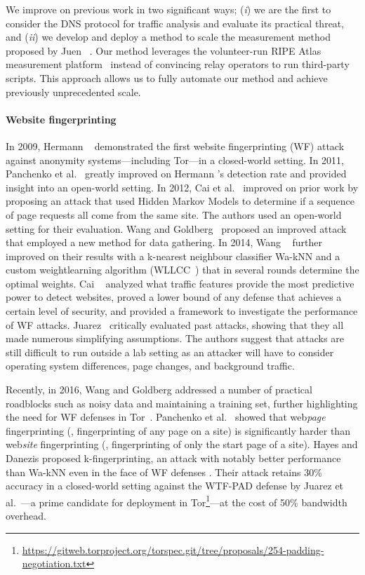 We improve on previous work in two significant ways; (\emph{i}) we are the first
to consider the DNS protocol for traffic analysis and evaluate its practical
threat, and (\emph{ii}) we develop and deploy a method to scale the measurement
method proposed by Juen \ea~\cite{Juen2015a}.  Our method leverages the
volunteer-run RIPE Atlas measurement platform~\cite{atlas} instead of convincing
relay operators to run third-party scripts.  This approach allows us to fully
automate our method and achieve previously unprecedented scale.

\paragraph{Website fingerprinting}
In 2009, Hermann \ea~\cite{Hermann2009a} demonstrated the first website
fingerprinting (WF) attack against anonymity systems---including Tor---in a
closed-world setting.  In 2011, Panchenko et al.~\cite{Panchenko2011a} greatly
improved on Hermann \ea's detection rate and provided insight into an open-world
setting.  In 2012, Cai et al.~\cite{Cai2012a} improved on prior work by
proposing an attack that used Hidden Markov Models to determine if a sequence of
page requests all come from the same site.  The authors used an open-world
setting for their evaluation.  Wang and Goldberg~\cite{Wang2013a} proposed an
improved attack that employed a new method for data gathering.  In 2014, Wang
\ea~\cite{Wang2014a} further improved on their results with a
k-nearest neighbour classifier Wa-kNN and a custom weightlearning algorithm
(WLLCC~\cite{WangThesis}) that in several rounds determine the optimal weights.
Cai \ea~\cite{Cai2014b}
analyzed what traffic features provide the most predictive power to detect
websites, proved a lower bound of any defense that achieves a certain level of
security, and provided a framework to investigate the performance of
WF attacks.  Juarez~\cite{Juarez2014a} critically evaluated past
attacks, showing that they all made numerous simplifying
assumptions.  The authors suggest that attacks are still
difficult to run outside a lab setting as an attacker will have to consider
operating system differences, page changes, and background traffic.

Recently, in 2016, Wang and Goldberg addressed a number of practical
roadblocks such as noisy data and maintaining a training set,
further highlighting the need for WF defenses in Tor~\cite{taoianreally}.
Panchenko et al.~\cite{Panchenko2016a} showed that
web\emph{page} fingerprinting (\ie, fingerprinting of any page on a site) is
significantly harder than web\emph{site} fingerprinting (\ie,
fingerprinting of only the start page of a site).
Hayes and Danezis proposed k-fingerprinting, an attack with
notably better performance than Wa-kNN even in the face of
WF defenses \cite{kfingerprinting}. Their attack retains 30\% accuracy in a
closed-world setting against the WTF-PAD defense by
Juarez et al.~\cite{DBLP:journals/corr/JuarezIPDW15}---a prime candidate for
deployment in Tor\footnote{\url{https://gitweb.torproject.org/torspec.git/tree/proposals/254-padding-negotiation.txt}}---at
the cost of 50\% bandwidth overhead.

